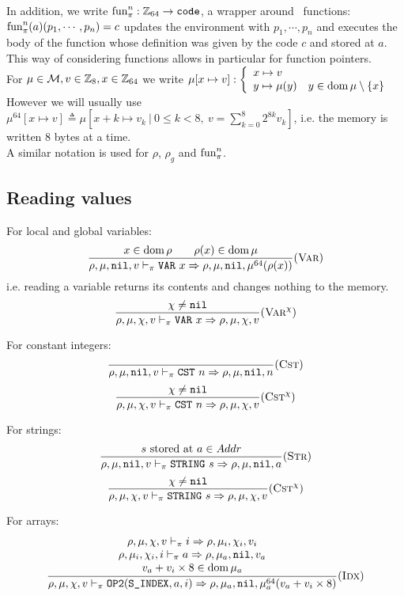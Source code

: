 In addition, we write \(\text{fun}_\pi^n: \mathbb{Z}_{64}\to \texttt{code}\), a wrapper around \Cmp\ functions: \(\text{fun}_\pi^n(a)(p_1, \cdots, p_n) = c\) updates the environment with \(p_1, \cdots, p_n\) and executes the body of the function whose definition was given by the code \(c\) and stored at \(a\). This way of considering functions allows in particular for function pointers.\\

For \(\mu\in\mathcal{M}, v\in\mathbb{Z}_{8}, x\in\mathbb{Z}_{64}\) we write \(\mu[x\mapsto v]: \left\{\begin{array}{ll}x\mapsto v & \\ y\mapsto \mu(y) & y\in \operatorname{dom}\mu\setminus\{x\}\end{array}\right.\)\\
However we will usually use \(\mu^{64}[x\mapsto v] \triangleq\mu[x+k\mapsto v_k\ |\  0\leq k<8,\ v = \sum_{k=0}^8 2^{8k}v_k]\), i.e. the memory is written 8 bytes at a time.\\

A similar notation is used for \(\rho\), \(\rho_g\) and \(\text{fun}_\pi^n\).

\subsection{Reading values}
For local and global variables:
\[\dfrac{x\in\operatorname{dom}\rho \qquad \rho(x)\in\operatorname{dom}\mu}{\rho,\mu,\texttt{nil},v \vdash_\pi \texttt{VAR}\ x\Rightarrow \rho,\mu,\texttt{nil},\mu^{64}(\rho(x))}(\textsc{Var})\]
i.e. reading a variable returns its contents and changes nothing to the memory.\\
\[\dfrac{\chi\ne\texttt{nil}}{\rho,\mu,\chi,v \vdash_\pi \texttt{VAR}\ x\Rightarrow \rho,\mu,\chi,v} (\textsc{Var}^\chi)\]

For constant integers:
\[\dfrac{}{\rho,\mu,\texttt{nil},v \vdash_\pi \texttt{CST}\ n\Rightarrow \rho,\mu,\texttt{nil},n}(\textsc{Cst})\]
\[\dfrac{\chi\ne\texttt{nil}}{\rho,\mu,\chi,v \vdash_\pi \texttt{CST}\ n\Rightarrow \rho,\mu,\chi,v} (\textsc{Cst}^\chi)\]

For strings:
\[\dfrac{s\text{ stored at }a\in Addr}{\rho,\mu,\texttt{nil},v \vdash_\pi \texttt{STRING}\ s\Rightarrow \rho,\mu,\texttt{nil},a}(\textsc{Str})\]
\[\dfrac{\chi\ne\texttt{nil}}{\rho,\mu,\chi,v \vdash_\pi \texttt{STRING}\ s\Rightarrow \rho,\mu,\chi,v} (\textsc{Cst}^\chi)\]

For arrays:
\[\dfrac{\begin{array}{c}
    \rho,\mu,\chi,v \vdash_\pi i\Rightarrow \rho,\mu_i,\chi_i,v_i \\
    \rho,\mu_i,\chi_i,i \vdash_\pi a\Rightarrow \rho,\mu_a,\texttt{nil},v_a \\
    v_a+v_i\times 8\in\operatorname{dom}\mu_a
\end{array}}{\rho,\mu,\chi,v \vdash_\pi \texttt{OP2}(\texttt{S\_INDEX}, a, i) \Rightarrow \rho,\mu_a,\texttt{nil},\mu_a^{64}(v_a+v_i\times 8)}(\textsc{Idx})\]

